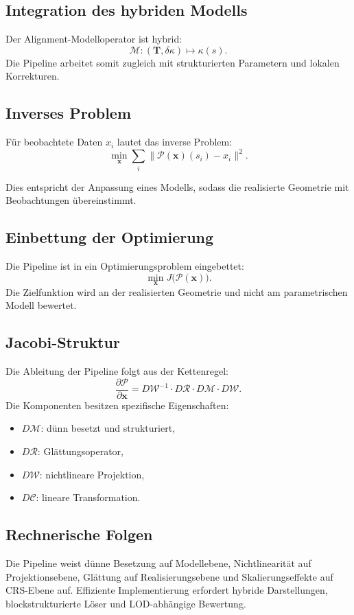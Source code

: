 \subsection{Integration des hybriden Modells}
Der Alignment-Modelloperator ist hybrid:
\[
\mathcal M:(\mathbf T,\delta\kappa)\mapsto\kappa(s).
\]
Die Pipeline arbeitet somit zugleich mit strukturierten Parametern und lokalen
Korrekturen.

\subsection{Inverses Problem}
\begin{definition}
Für beobachtete Daten \(x_i\) lautet das inverse Problem:
\[
\min_{\mathbf x}\sum_i\|\mathcal P(\mathbf x)(s_i)-x_i\|^2.
\]
\end{definition}
Dies entspricht der Anpassung eines Modells, sodass die realisierte Geometrie
mit Beobachtungen übereinstimmt.

\subsection{Einbettung der Optimierung}
Die Pipeline ist in ein Optimierungsproblem eingebettet:
\[
\min_{\mathbf x}J\bigl(\mathcal P(\mathbf x)\bigr).
\]
Die Zielfunktion wird an der realisierten Geometrie und nicht am parametrischen
Modell bewertet.

\subsection{Jacobi-Struktur}
Die Ableitung der Pipeline folgt aus der Kettenregel:
\[
\frac{\partial\mathcal P}{\partial\mathbf x}
=D\mathcal W^{-1}\cdot D\mathcal R\cdot D\mathcal M\cdot D\mathcal W.
\]
Die Komponenten besitzen spezifische Eigenschaften:
\begin{itemize}
\item \(D\mathcal M\): dünn besetzt und strukturiert,
\item \(D\mathcal R\): Glättungsoperator,
\item \(D\mathcal W\): nichtlineare Projektion,
\item \(D\mathcal C\): lineare Transformation.
\end{itemize}

\subsection{Rechnerische Folgen}
Die Pipeline weist dünne Besetzung auf Modellebene, Nichtlinearität auf
Projektionsebene, Glättung auf Realisierungsebene und Skalierungseffekte auf
CRS-Ebene auf. Effiziente Implementierung erfordert hybride Darstellungen,
blockstrukturierte Löser und LOD-abhängige Bewertung.

